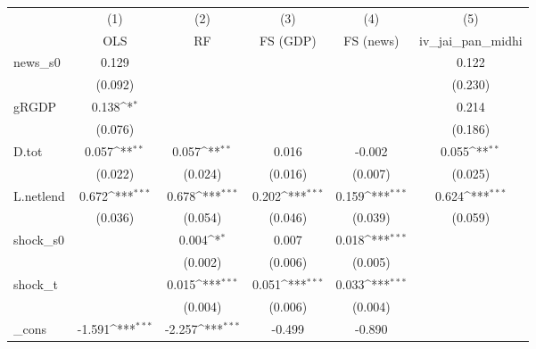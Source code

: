 {
\def\sym#1{\ifmmode^{#1}\else\(^{#1}\)\fi}
\begin{tabular}{l*{5}{c}}
\toprule
            &\multicolumn{1}{c}{(1)}&\multicolumn{1}{c}{(2)}&\multicolumn{1}{c}{(3)}&\multicolumn{1}{c}{(4)}&\multicolumn{1}{c}{(5)}\\
            &\multicolumn{1}{c}{OLS}&\multicolumn{1}{c}{RF}&\multicolumn{1}{c}{FS (GDP)}&\multicolumn{1}{c}{FS (news)}&\multicolumn{1}{c}{iv\_jai\_pan\_midhi}\\
\midrule
news\_s0     &       0.129         &                     &                     &                     &       0.122         \\
            &     (0.092)         &                     &                     &                     &     (0.230)         \\
\addlinespace
gRGDP       &       0.138\sym{*}  &                     &                     &                     &       0.214         \\
            &     (0.076)         &                     &                     &                     &     (0.186)         \\
\addlinespace
D.tot       &       0.057\sym{**} &       0.057\sym{**} &       0.016         &      -0.002         &       0.055\sym{**} \\
            &     (0.022)         &     (0.024)         &     (0.016)         &     (0.007)         &     (0.025)         \\
\addlinespace
L.netlend   &       0.672\sym{***}&       0.678\sym{***}&       0.202\sym{***}&       0.159\sym{***}&       0.624\sym{***}\\
            &     (0.036)         &     (0.054)         &     (0.046)         &     (0.039)         &     (0.059)         \\
\addlinespace
shock\_s0    &                     &       0.004\sym{*}  &       0.007         &       0.018\sym{***}&                     \\
            &                     &     (0.002)         &     (0.006)         &     (0.005)         &                     \\
\addlinespace
shock\_t     &                     &       0.015\sym{***}&       0.051\sym{***}&       0.033\sym{***}&                     \\
            &                     &     (0.004)         &     (0.006)         &     (0.004)         &                     \\
\addlinespace
\_cons      &      -1.591\sym{***}&      -2.257\sym{***}&      -0.499         &      -0.890         &                     \\

\end{tabular}}
